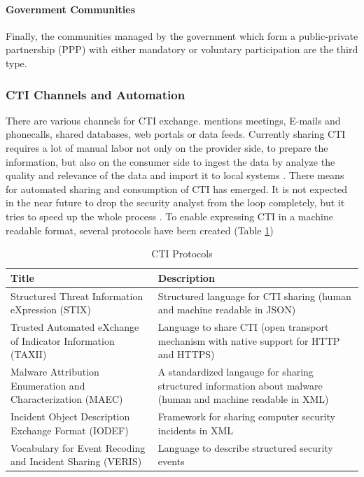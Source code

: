 \paragraph{Government Communities}
Finally, the communities managed by the government which form a public-private partnership (PPP) with either mandatory or voluntary participation are the third type. 

\subsubsection{CTI Channels and Automation}
\label{subsubsec:cti-channels}
There are various channels for CTI exchange. \cite{wagner_cyber_2019} mentions meetings, E-mails and phonecalls, shared databases, web portals or data feeds. Currently sharing CTI requires a lot of manual labor not only on the provider side, to prepare the information, but also on the consumer side to ingest the data by analyze the quality and relevance of the data and import it to local systems \cite{wagner_cyber_2019}. There means for automated sharing and consumption of CTI has emerged. It is not expected in the near future to drop the security analyst from the loop completely, but it tries to speed up the whole process \cite{wagner_cyber_2019}. To enable expressing CTI in a machine readable format, several protocols have been created  (Table \ref{tab:cti-protocols})

\begin{table}[ht]
    \label{tab:cti-protocols}
    \centering
    \begin{tabular}{|p{} p{}|}
    \hline
    \textbf{Title} & \textbf{Description} \\
    \hline
    \hline
    Structured Threat Information eXpression (STIX) \cite{stix_documentation_2024} & Structured language for CTI sharing (human and machine readable in JSON) \\
    \hline
    Trusted Automated eXchange of Indicator Information (TAXII) \cite{stix_documentation_2024} & Language to share CTI (open transport mechanism with native support for HTTP and HTTPS) \\
    \hline
    Malware Attribution Enumeration and Characterization (MAEC) \cite{maec_project_documentation_2024} & A standardized langauge for sharing structured information about malware (human and machine readable in XML) \\
    \hline
    Incident Object Description Exchange Format (IODEF) \cite{kampanakis_incident_2017} & Framework for sharing computer security incidents in XML \\
    \hline
    Vocabulary for Event Recoding and Incident Sharing (VERIS) \cite{veris_framework} & Language to describe structured security events \\
    \hline
    \end{tabular}
    \caption{CTI Protocols \cite{wagner_cyber_2019}}
\end{table}

